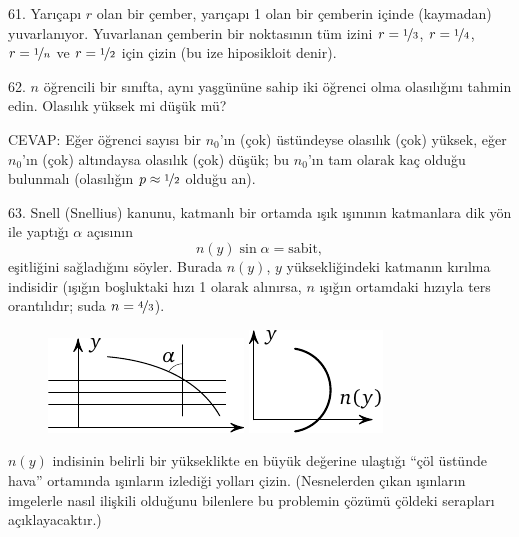 \begin{problem}{61.}
	Yarıçapı $r$ olan bir çember, yarıçapı 1 olan bir çemberin içinde (kaymadan) yuvarlanıyor.
	Yuvarlanan çemberin bir noktasının tüm izini $r=\nicefrac{1}{3}$,  $r=\nicefrac{1}{4}$, $r=\nicefrac{1}{n}$ ve $r=\nicefrac{1}{2}$ için çizin (bu ize hiposikloit denir).
\end{problem}

\begin{problem}{62.}
	$n$ öğrencili  bir sınıfta,  aynı yaşgününe sahip iki öğrenci olma olasılığını tahmin edin. Olasılık yüksek mi düşük mü?

	\begin{note}{CEVAP:}
		Eğer öğrenci sayısı bir $n_0$'ın (çok) üstündeyse olasılık (çok) yüksek,
		eğer $n_0$'ın (çok) altındaysa olasılık (çok) düşük;  bu $n_0$'ın tam olarak kaç olduğu bulunmalı (olasılığın $p \approx \nicefrac{1}{2}$ olduğu an).
	\end{note}
\end{problem}

\begin{problem}{63.}
	Snell (Snellius) kanunu, katmanlı bir ortamda ışık ışınının kat\-man\-la\-ra dik yön ile yaptığı  $\alpha$ açısının
	\begin{equation*}
		n(y) \sin \alpha=\text{sabit},
	\end{equation*}
	eşitliğini sağladığını söyler. Burada  $n(y)$, $y$ yüksekliğindeki katmanın kırılma indisidir (ışığın boşluktaki hızı 1 olarak alınırsa, $n$ ışığın or\-tam\-da\-ki hızıyla ters orantılıdır; suda $n=\nicefrac{4}{3}$).
	\begin{figure}
		\null\hfill
		\includegraphics{resources/taskbook-47}
		\hfill
		\includegraphics{resources/taskbook-471}
		\hfill\null
	\end{figure}

	$n(y)$ indisinin belirli bir yükseklikte en büyük değerine ulaştığı \enquote{çöl üstünde hava} ortamında ışınların izlediği yolları çizin. (Nesnelerden çıkan ışınların imgelerle nasıl ilişkili olduğunu bilenlere bu problemin çözümü çöldeki serapları açıklayacaktır.) 
\end{problem}

